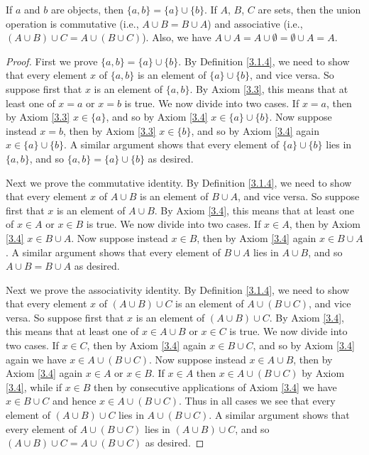 \begin{lemma}\label{3.1.13}
If \(a\) and \(b\) are objects, then \(\{a, b\} = \{a\} \cup \{b\}\).
If \(A\), \(B\), \(C\) are sets, then the union operation is commutative (i.e., \(A \cup B = B \cup A\)) and associative (i.e., \((A \cup B) \cup C = A \cup (B \cup C)\)).
Also, we have \(A \cup A = A \cup \emptyset = \emptyset \cup A = A\).
\end{lemma}

\begin{proof}
First we prove \(\{a, b\} = \{a\} \cup \{b\}\).
By Definition \ref{3.1.4}, we need to show that every element \(x\) of \(\{a, b\}\) is an element of \(\{a\} \cup \{b\}\), and vice versa.
So suppose first that \(x\) is an element of \(\{a, b\}\).
By Axiom \ref{3.3}, this means that at least one of \(x = a\) or \(x = b\) is true.
We now divide into two cases.
If \(x = a\), then by Axiom \ref{3.3} \(x \in \{a\}\), and so by Axiom \ref{3.4} \(x \in \{a\} \cup \{b\}\).
Now suppose instead \(x = b\), then by Axiom \ref{3.3} \(x \in \{b\}\), and so by Axiom \ref{3.4} again \(x \in \{a\} \cup \{b\}\).
A similar argument shows that every element of \(\{a\} \cup \{b\}\) lies in \(\{a, b\}\), and so \(\{a, b\} = \{a\} \cup \{b\}\) as desired.

Next we prove the commutative identity.
By Definition \ref{3.1.4}, we need to show that every element \(x\) of \(A \cup B\) is an element of \(B \cup A\), and vice versa.
So suppose first that \(x\) is an element of \(A \cup B\).
By Axiom \ref{3.4}, this means that at least one of \(x \in A\) or \(x \in B\) is true.
We now divide into two cases.
If \(x \in A\), then by Axiom \ref{3.4} \(x \in B \cup A\).
Now suppose instead \(x \in B\), then by Axiom \ref{3.4} again \(x \in B \cup A\).
A similar argument shows that every element of \(B \cup A\) lies in \(A \cup B\), and so \(A \cup B = B \cup A\) as desired.

Next we prove the associativity identity.
By Definition \ref{3.1.4}, we need to show that every element \(x\) of \((A \cup B) \cup C\) is an element of \(A \cup (B \cup C)\), and vice versa.
So suppose first that \(x\) is an element of \((A \cup B) \cup C\).
By Axiom \ref{3.4}, this means that at least one of \(x \in A \cup B\) or \(x \in C\) is true.
We now divide into two cases.
If \(x \in C\), then by Axiom \ref{3.4} again \(x \in B \cup C\), and so by Axiom \ref{3.4} again we have \(x \in A \cup (B \cup C)\).
Now suppose instead \(x \in A \cup B\), then by Axiom \ref{3.4} again \(x \in A\) or \(x \in B\).
If \(x \in A\) then \(x \in A \cup (B \cup C)\) by Axiom \ref{3.4}, while if \(x \in B\) then by consecutive applications of Axiom \ref{3.4} we have \(x \in B \cup C\) and hence \(x \in A \cup (B \cup C)\).
Thus in all cases we see that every element of \((A \cup B) \cup C\) lies in \(A \cup (B \cup C)\).
A similar argument shows that every element of \(A \cup (B \cup C)\) lies in \((A \cup B) \cup C\), and so \((A \cup B) \cup C = A \cup (B \cup C) \) as desired.


\end{proof}
